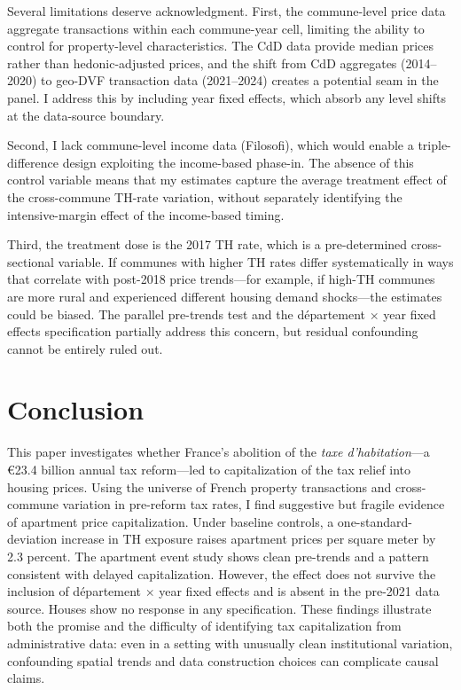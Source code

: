 \documentclass[12pt]{article}
\begin{document}
Several limitations deserve acknowledgment. First, the commune-level price data aggregate transactions within each commune-year cell, limiting the ability to control for property-level characteristics. The CdD data provide median prices rather than hedonic-adjusted prices, and the shift from CdD aggregates (2014--2020) to geo-DVF transaction data (2021--2024) creates a potential seam in the panel. I address this by including year fixed effects, which absorb any level shifts at the data-source boundary.

Second, I lack commune-level income data (Filosofi), which would enable a triple-difference design exploiting the income-based phase-in. The absence of this control variable means that my estimates capture the average treatment effect of the cross-commune TH-rate variation, without separately identifying the intensive-margin effect of the income-based timing.

Third, the treatment dose is the 2017 TH rate, which is a pre-determined cross-sectional variable. If communes with higher TH rates differ systematically in ways that correlate with post-2018 price trends---for example, if high-TH communes are more rural and experienced different housing demand shocks---the estimates could be biased. The parallel pre-trends test and the d\'{e}partement $\times$ year fixed effects specification partially address this concern, but residual confounding cannot be entirely ruled out.


\section{Conclusion}

This paper investigates whether France's abolition of the \emph{taxe d'habitation}---a \euro{}23.4 billion annual tax reform---led to capitalization of the tax relief into housing prices. Using the universe of French property transactions and cross-commune variation in pre-reform tax rates, I find suggestive but fragile evidence of apartment price capitalization. Under baseline controls, a one-standard-deviation increase in TH exposure raises apartment prices per square meter by 2.3 percent. The apartment event study shows clean pre-trends and a pattern consistent with delayed capitalization. However, the effect does not survive the inclusion of d\'{e}partement $\times$ year fixed effects and is absent in the pre-2021 data source. Houses show no response in any specification. These findings illustrate both the promise and the difficulty of identifying tax capitalization from administrative data: even in a setting with unusually clean institutional variation, confounding spatial trends and data construction choices can complicate causal claims.
\end{document}
